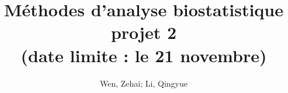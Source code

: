 \documentclass[12pt]{report}
\title{Méthodes d'analyse biostatistique projet 2 \\ (date limite : le 21 novembre)}
\author{Wen, Zehai; Li, Qingyue }
\date{\DTMnow}
\theoremstyle{plain}
\theoremstyle{definition}
\begin{document}
\begin{CJK*}{UTF8}{gbsn}
\maketitle

\setcounter{tocdepth}{0}











\end{CJK*}
\end{document}
